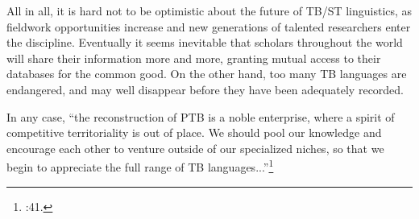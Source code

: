 All in all, it is hard not to be optimistic about the future of TB/ST linguistics, as fieldwork opportunities increase and new generations of talented researchers enter the discipline. Eventually it seems inevitable that scholars throughout the world will share their information more and more, granting mutual access to their databases for the common good. On the other hand, too many TB languages are endangered, and may well disappear before they have been adequately recorded.

In any case, “the reconstruction of PTB is a noble enterprise, where a spirit of competitive territoriality is out of place. We should pool our knowledge and encourage each other to venture outside of our specialized niches, so that we begin to appreciate the full range of TB languages...”\footnote{\citealt{JAM-PLPS}:41.}
